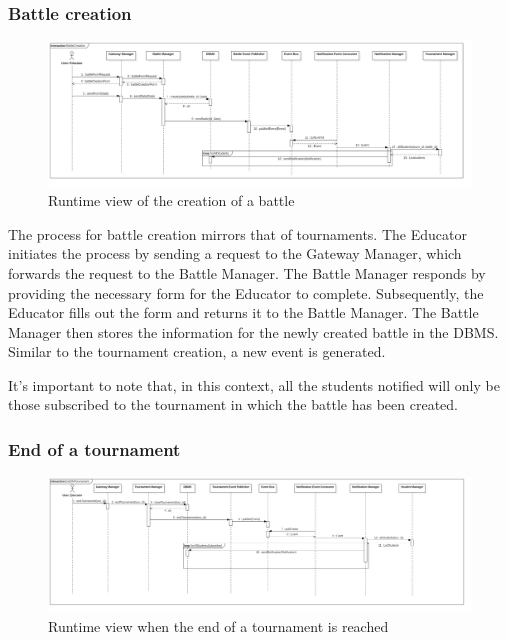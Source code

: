 \subsubsection*{Battle creation}
\begin{figure}[h!]
    \centering
    \includegraphics[width=1.3\linewidth, angle=90]{2.ArchitecturalDesign/res/BattleCreation.jpg}
    \caption{Runtime view of the creation of a battle}
    \label{fig:battle_creation}
\end{figure}

The process for battle creation mirrors that of tournaments. The Educator initiates the process by sending a request to the Gateway Manager, which forwards the request to the Battle Manager. The Battle Manager responds by providing the necessary form for the Educator to complete. Subsequently, the Educator fills out the form and returns it to the Battle Manager. The Battle Manager then stores the information for the newly created battle in the DBMS. Similar to the tournament creation, a new event is generated.

It's important to note that, in this context, all the students notified will only be those subscribed to the tournament in which the battle has been created.

\newpage

\subsubsection*{End of a tournament}
\begin{figure}[h!]
    \centering
    \includegraphics[width=1.3\linewidth, angle=90]{2.ArchitecturalDesign/res/EndOfATournament.jpg}
    \caption{Runtime view when the end of a tournament is reached}
    \label{fig:tournament_end}
\end{figure}

